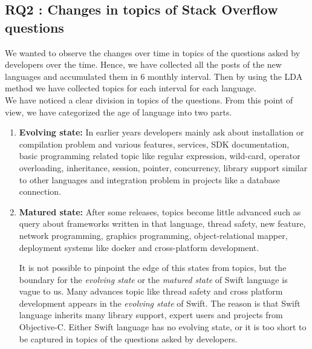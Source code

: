 \subsection{RQ2 : Changes in topics of Stack Overflow questions}
\label{RQ2}

We wanted to observe the changes over time in topics of the questions asked by developers over the time. Hence, we have collected all the posts of the new languages and accumulated them in 6 monthly interval. Then by using the LDA method we have collected topics for each interval for each language.\\
We have noticed a clear division in topics of the questions. From this point of view, we have categorized the age  of language into two parts.

\begin{enumerate}[label=(\Alph*)]

\item \textbf{Evolving state:} In earlier years developers mainly ask about installation or compilation problem and various features, services, SDK documentation, basic programming related topic like regular expression, wild-card, operator overloading, inheritance, session, pointer, concurrency, library support similar to other languages and integration problem in projects like a database connection.

\item \textbf{Matured state:} After some releases, topics become little advanced such as query about frameworks written in that language, thread safety, new feature, network programming, graphics programming, object-relational mapper, deployment systems like docker and cross-platform development.

It is not possible to pinpoint the edge of this states from topics, but the boundary for the \emph{evolving state} or the \emph{matured state} of Swift language is vague to us. Many advances topic like thread safety and cross platform development  appears in the \emph{evolving state} of Swift. The reason is that Swift language inherits many library support, expert users and projects from Objective-C. Either Swift language has no evolving state, or it is too short to be captured in topics of the questions asked by developers.



\end{enumerate}